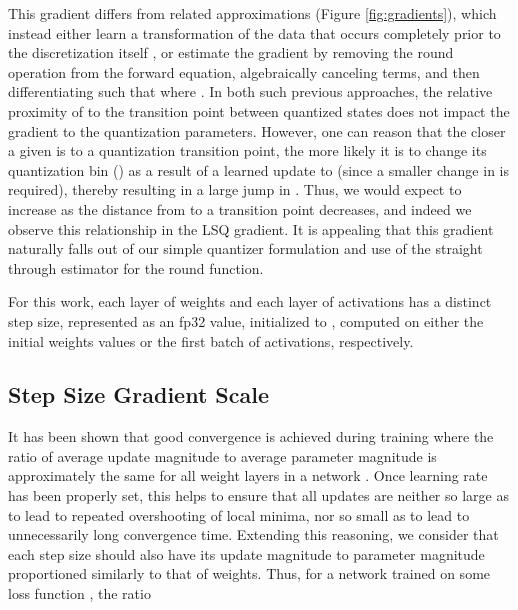 \documentclass{article}
\begin{document}
This gradient differs from related approximations (Figure \ref{fig:gradients}),
which instead either learn a transformation of the data that occurs completely prior to the discretization itself \citep{jung2018joint}, or estimate the gradient by removing the round operation from the forward equation, algebraically canceling terms, and then differentiating such that  where  \citep{choi2018pact,choi2018bridging}.
In both such previous approaches, the relative proximity of  to the transition point between quantized states does not impact the gradient to the quantization parameters.
However, one can reason that the closer a given  is to a quantization transition point, the more likely it is to change its quantization bin () as a result of a learned update to  (since a smaller change in  is required), thereby resulting in a large jump in .  Thus, we would expect  to increase as the distance from  to a transition point decreases, and indeed we observe this relationship in the LSQ gradient.  It is appealing that this gradient naturally falls out of our simple quantizer formulation and use of the straight through estimator for the round function.



For this work, each layer of weights and each layer of activations has a distinct step size, represented as an fp32 value, initialized to , computed on either the initial weights values or the first batch of activations, respectively.



\subsection{Step Size Gradient Scale}
\label{methods:gradscale}

It has been shown that good convergence is achieved during training where the ratio of average update magnitude to average parameter magnitude is approximately the same for all weight layers in a network \citep{you2017large}.
Once learning rate has been properly set, this helps to ensure that all updates are neither so large as to lead to repeated overshooting of local minima, nor so small as to lead to unnecessarily long convergence time. 
Extending this reasoning, we consider that each step size should also have its update magnitude to parameter magnitude proportioned similarly to that of weights.
Thus, for a network trained on some loss function , the ratio
\end{document}
